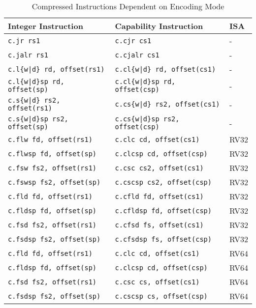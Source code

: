 {\begin{table}
\begin{center}
\begin{tabular}{lll}
\toprule
Integer Instruction		& Capability Instruction & ISA \\
\midrule
\texttt{c.jr rs1} & \texttt{c.cjr cs1} & - \\
\texttt{c.jalr rs1} & \texttt{c.cjalr cs1} & - \\
\texttt{c.l\{w|d\} rd, offset(rs1)} & \texttt{c.cl\{w|d\} rd, offset(cs1)} & - \\
\texttt{c.l\{w|d\}sp rd, offset(sp)} & \texttt{c.cl\{w|d\}sp rd, offset(csp)} & - \\
\texttt{c.s\{w|d\} rs2, offset(rs1)} & \texttt{c.cs\{w|d\} rs2, offset(cs1)} & - \\
\texttt{c.s\{w|d\}sp rs2, offset(sp)} & \texttt{c.cs\{w|d\}sp rs2, offset(csp)} & - \\
\texttt{c.flw fd, offset(rs1)} & \texttt{c.clc cd, offset(cs1)} & RV32 \\
\texttt{c.flwsp fd, offset(sp)} & \texttt{c.clcsp cd, offset(csp)} & RV32 \\
\texttt{c.fsw fs2, offset(rs1)} & \texttt{c.csc cs2, offset(cs1)} & RV32 \\
\texttt{c.fswsp fs2, offset(sp)} & \texttt{c.cscsp cs2, offset(csp)} & RV32 \\
\texttt{c.fld fd, offset(rs1)} & \texttt{c.cfld fd, offset(cs1)} & RV32 \\
\texttt{c.fldsp fd, offset(sp)} & \texttt{c.cfldsp fd, offset(csp)} & RV32 \\
\texttt{c.fsd fs2, offset(rs1)} & \texttt{c.cfsd fs, offset(cs1)} & RV32 \\
\texttt{c.fsdsp fs2, offset(sp)} & \texttt{c.cfsdsp fs, offset(csp)} & RV32 \\
\texttt{c.fld fd, offset(rs1)} & \texttt{c.clc cd, offset(cs1)} & RV64 \\
\texttt{c.fldsp fd, offset(sp)} & \texttt{c.clcsp cd, offset(csp)} & RV64 \\
\texttt{c.fsd fs2, offset(rs1)} & \texttt{c.csc cs, offset(cs1)} & RV64 \\
\texttt{c.fsdsp fs2, offset(sp)} & \texttt{c.cscsp cs, offset(csp)} & RV64 \\
\bottomrule
\end{tabular}
\end{center}
\caption{Compressed Instructions Dependent on Encoding Mode}
\label{table:riscv-capmode-instructions-rvc}
\end{table}

}
